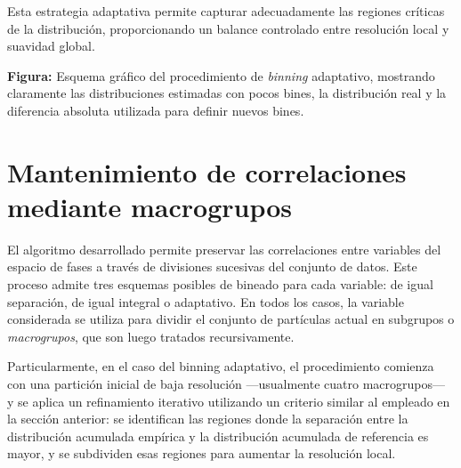 Esta estrategia adaptativa permite capturar adecuadamente las regiones críticas de la distribución, proporcionando un balance controlado entre resolución local y suavidad global.



\textbf{Figura:} Esquema gráfico del procedimiento de \textit{binning} adaptativo, mostrando claramente las distribuciones estimadas con pocos bines, la distribución real y la diferencia absoluta utilizada para definir nuevos bines.

\section{Mantenimiento de correlaciones mediante macrogrupos}

El algoritmo desarrollado permite preservar las correlaciones entre variables del espacio de fases a través de divisiones sucesivas del conjunto de datos. Este proceso admite tres esquemas posibles de bineado para cada variable: de igual separación, de igual integral o adaptativo. En todos los casos, la variable considerada se utiliza para dividir el conjunto de partículas actual en subgrupos o \emph{macrogrupos}, que son luego tratados recursivamente.

Particularmente, en el caso del binning adaptativo, el procedimiento comienza con una partición inicial de baja resolución —usualmente cuatro macrogrupos— y se aplica un refinamiento iterativo utilizando un criterio similar al empleado en la sección anterior: se identifican las regiones donde la separación entre la distribución acumulada empírica y la distribución acumulada de referencia es mayor, y se subdividen esas regiones para aumentar la resolución local.

